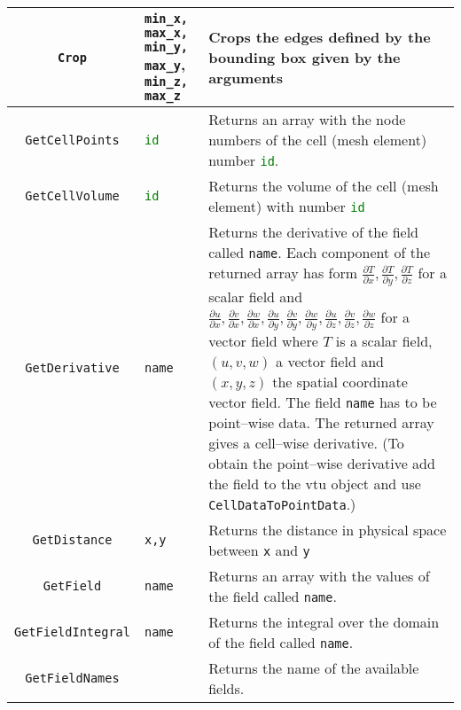 \begin{landscape}
\begin{longtable}{|c | p{} |p{}|}
\lstinline[language=Python]+Crop+ & \lstinline[language=Python]+min_x, max_x,+ \lstinline[language=Python]+min_y, max_y+, \lstinline[language=Python]+min_z, max_z+ & Crops the edges defined by the bounding box given by the arguments \\ \hline
%
\lstinline[language=Python]+GetCellPoints+ & \lstinline[language=Python]+id+ & Returns an array with the node numbers of the cell (mesh element) number \lstinline[language=Python]+id+. \\ \hline
%
\lstinline[language=Python]+GetCellVolume+ & \lstinline[language=Python]+id+ & Returns the volume of the cell (mesh element) with number \lstinline[language=Python]+id+ \\ \hline
%
\lstinline[language=Python]+GetDerivative+ & \lstinline[language=Python]+name+ & Returns the derivative of the field called \lstinline[language=Python]+name+. Each component of the returned array has form $ \frac{\partial T}{\partial x}, \frac{\partial T}{\partial y}, \frac{\partial T}{\partial z}$ for a scalar field and $\frac{\partial u}{\partial x}, \frac{\partial v}{\partial x}, \frac{\partial w}{\partial x}, \frac{\partial u}{\partial y}, \frac{\partial v}{\partial y}, \frac{\partial w}{\partial y}, \frac{\partial u}{\partial z}, \frac{\partial v}{\partial z}, \frac{\partial w}{\partial z}$ for a vector field where $T$ is a scalar field, $(u,v,w)$ a vector field and $(x,y,z)$ the spatial coordinate vector field. The field \lstinline[language=Python]+name+ has to be point--wise data. The returned array gives a cell--wise derivative. (To obtain the point--wise derivative add the field to the vtu object and use \lstinline[language=Python]+CellDataToPointData+.)  \\ \hline
%
\lstinline[language=Python]+GetDistance+ & \lstinline[language=Python]+x,y+ & Returns the distance in physical space between \lstinline[language=Python]+x+ and \lstinline[language=Python]+y+ \\ \hline
%
\lstinline[language=Python]+GetField+ & \lstinline[language=Python]+name+ & Returns an array with the values of the field called \lstinline[language=Python]+name+. \\ \hline
%
\lstinline[language=Python]+GetFieldIntegral+ & \lstinline[language=Python]+name+ & Returns the integral over the domain of the field called \lstinline[language=Python]+name+. \\ \hline
%
\lstinline[language=Python]+GetFieldNames+ & & Returns the name of the available fields. \\ \hline

\end{longtable}
\end{landscape}
